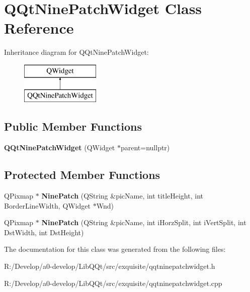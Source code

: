 \hypertarget{class_q_qt_nine_patch_widget}{}\section{Q\+Qt\+Nine\+Patch\+Widget Class Reference}
\label{class_q_qt_nine_patch_widget}
Inheritance diagram for Q\+Qt\+Nine\+Patch\+Widget\+:\begin{figure}[H]
\begin{center}
\leavevmode
\includegraphics[height=2.000000cm]{class_q_qt_nine_patch_widget}
\end{center}
\end{figure}
\subsection*{Public Member Functions}
\begin{DoxyCompactItemize}
\item 
\mbox{\label{class_q_qt_nine_patch_widget_a8d2b029fc79944f90c9ce1e5dea009c7}} 
{\bfseries Q\+Qt\+Nine\+Patch\+Widget} (Q\+Widget $\ast$parent=nullptr)
\end{DoxyCompactItemize}
\subsection*{Protected Member Functions}
\begin{DoxyCompactItemize}
\item 
\mbox{\label{class_q_qt_nine_patch_widget_a382e374f7670c0ab8249ab4cb4cf9a2d}} 
Q\+Pixmap $\ast$ {\bfseries Nine\+Patch} (Q\+String \&pic\+Name, int title\+Height, int Border\+Line\+Width, Q\+Widget $\ast$Wnd)
\item 
\mbox{\label{class_q_qt_nine_patch_widget_a9aae3969496d991b8d9387a367317bb1}} 
Q\+Pixmap $\ast$ {\bfseries Nine\+Patch} (Q\+String \&pic\+Name, int i\+Horz\+Split, int i\+Vert\+Split, int Dst\+Width, int Dst\+Height)
\end{DoxyCompactItemize}


The documentation for this class was generated from the following files\+:\begin{DoxyCompactItemize}
\item 
R\+:/\+Develop/a0-\/develop/\+Lib\+Q\+Qt/src/exquisite/qqtninepatchwidget.\+h\item 
R\+:/\+Develop/a0-\/develop/\+Lib\+Q\+Qt/src/exquisite/qqtninepatchwidget.\+cpp\end{DoxyCompactItemize}
